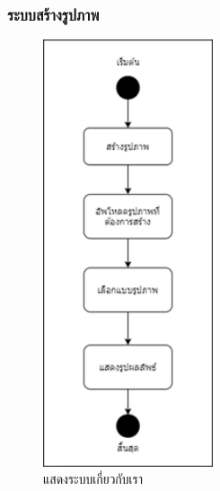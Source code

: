 \documentclass[12pt,oneside,openright,a4paper]{cpe-thai-project}
\begin{document}
\subsubsection{ระบบสร้างรูปภาพ}
\begin{figure}[!h]
  \centering
  \includegraphics[width=5cm]{./image/ad-createPic.png}
  \caption{แสดงระบบเกี่ยวกับเรา}
  \label{fig:ad-createPic}
\end{figure}
\end{document}
